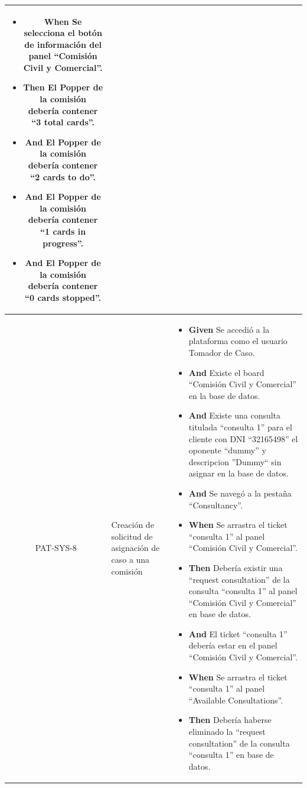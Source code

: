 \begin{longtable}{|c|p{2.5cm}|p{10.5cm}|}
\begin{itemize}
        \newline
        \item \textbf{When} Se selecciona el botón de información del panel ``Comisión Civil y Comercial''.
        \newline
        \item \textbf{Then} El Popper de la comisión debería contener ``3 total cards''.
        \item \textbf{And} El Popper de la comisión debería contener ``2 cards to do''.
        \item \textbf{And} El Popper de la comisión debería contener ``1 cards in progress''.
        \item \textbf{And} El Popper de la comisión debería contener ``0 cards stopped''.
    \end{itemize}
    \\
    \hline
    PAT-SYS-8 & Creación de solicitud de asignación de caso a una comisión &
    \begin{itemize}
        \item \textbf{Given} Se accedió a la plataforma como el usuario Tomador de Caso.
        \item \textbf{And} Existe el board ``Comisión Civil y Comercial'' en la base de datos.
        \item \textbf{And} Existe una consulta titulada ``consulta 1'' para el cliente con DNI ``32165498'' el oponente ``dummy'' y descripcion ''Dummy`` sin asignar en la base de datos.
        \item \textbf{And} Se navegó a la pestaña ``Consultancy''.
        \newline
        \item \textbf{When} Se arrastra el ticket ``consulta 1'' al panel ``Comisión Civil y Comercial''.
        \newline
        \item \textbf{Then} Debería existir una ``request consultation'' de la consulta ``consulta 1'' al panel ``Comisión Civil y Comercial'' en base de datos.
        \item \textbf{And} El ticket ``consulta 1'' debería estar en el panel ``Comisión Civil y Comercial''.
        \newline
        \item \textbf{When} Se arrastra el ticket ``consulta 1'' al panel ``Available Consultations''.
        \newline
        \item \textbf{Then} Debería haberse eliminado la ``request consultation'' de la consulta ``consulta 1'' en base de datos.

\end{itemize}
\end{longtable}
